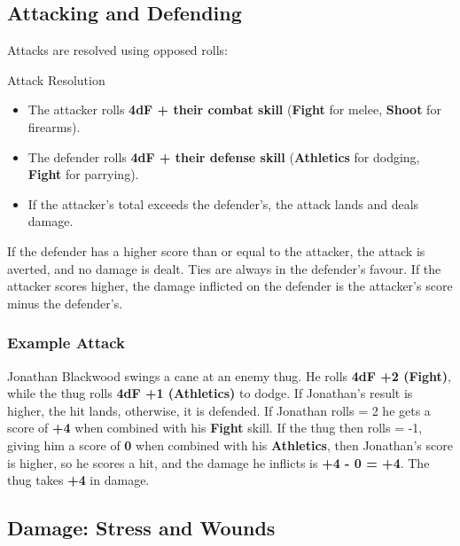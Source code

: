 \subsection{Attacking and Defending}

Attacks are resolved using opposed rolls:
\begin{DndReadAloud}{Attack Resolution}
	\begin{itemize}
    	\item The attacker rolls \textbf{4dF + their combat skill} (\textbf{Fight} for melee, \textbf{Shoot} for firearms).
	    \item The defender rolls \textbf{4dF + their defense skill} (\textbf{Athletics} for dodging, \textbf{Fight} for parrying).
	    \item If the attacker’s total exceeds the defender’s, the attack lands and deals damage.
	\end{itemize}
\end{DndReadAloud}

If the defender has a higher score than or equal to the attacker, the attack is averted, and no damage is dealt. Ties are always in the defender's favour. If the attacker scores higher, the damage inflicted on the defender is the attacker's score minus the defender's.

\begin{DndReadAloud}{}
	\subsubsection{Example Attack}
	Jonathan Blackwood swings a cane at an enemy thug. He rolls \textbf{4dF +2 (Fight)}, while the thug rolls \textbf{4dF +1 (Athletics)} to dodge. If Jonathan’s result is higher, the hit lands, otherwise, it is defended. If Jonathan rolls \FudgeRes{+++-} = 2 he gets a score of \textbf{+4} when combined with his \textbf{Fight} skill. If the thug then rolls  = -1, giving him a score of \textbf{0} when combined with his \textbf{Athletics}, then Jonathan's score is higher, so he scores a hit, and the damage he inflicts is \textbf{+4 - 0 = +4}. The thug takes \textbf{+4} in damage.
\end{DndReadAloud}


\subsection{Damage: Stress and Wounds}

